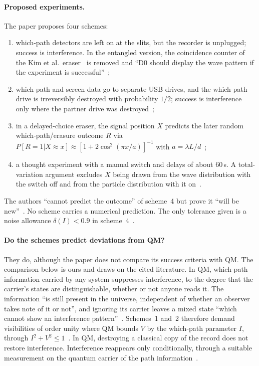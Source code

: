 \paragraph{Proposed experiments.}
The paper proposes four schemes:
\begin{enumerate}
\item which-path detectors are left on at the slits, but the recorder is
  unplugged; success is interference. In the entangled version, the
  coincidence counter of the Kim et al.\ eraser~\cite{Kim2000delayed} is
  removed and ``D0 should display the wave pattern if the experiment is
  successful''~\cite[p.~86]{Campbell2017on};
\item which-path and screen data go to separate USB drives, and the which-path
  drive is irreversibly destroyed with probability $1/2$; success is
  interference only where the partner drive was
  destroyed~\cite[pp.~87--88]{Campbell2017on};
\item in a delayed-choice eraser, the signal position $X$ predicts the later
  random which-path/erasure outcome $R$ via
  $P[R{=}1|X{\approx}x]\approx[1+2\cos^2(\pi x/a)]^{-1}$ with
  $a=\lambda L/d$~\cite[Eq.~(2)]{Campbell2017on};
\item a thought experiment with a manual switch and delays of about 60\,s. A
  total-variation argument excludes $X$ being drawn from the wave distribution
  with the switch off and from the particle distribution with it
  on~\cite[Eqs.~(3)--(4)]{Campbell2017on}.
\end{enumerate}
The authors ``cannot predict the outcome'' of scheme~4 but prove it ``will be
new''~\cite[p.~83]{Campbell2017on}. No scheme carries a numerical prediction.
The only tolerance given is a noise allowance $\delta(I)<0.9$ in
scheme~4~\cite[p.~94]{Campbell2017on}.

\paragraph{Do the schemes predict deviations from QM?}
They do, although the paper does not compare its success criteria with QM. The
comparison below is ours and draws on the cited literature. In QM, which-path
information carried by any system suppresses interference, to the degree that the
carrier's states are distinguishable, whether or not anyone reads it. The information ``is still present in the universe, independent of
whether an observer takes note of it or not'', and ignoring its carrier leaves
a mixed state ``which cannot show an interference
pattern''~\cite[Sec.~II.E]{Ma2016delayed}. Schemes~1 and~2 therefore demand
visibilities of order unity where QM bounds $V$ by the which-path parameter $I$,
through $I^2+V^2\le1$~\cite{Englert1996fringe,Ma2013quantum}. In QM,
destroying a classical copy of the record does not restore interference. Interference
reappears only conditionally, through a suitable measurement on the quantum
carrier of the path information~\cite{Ma2016delayed,Kastner2019delayed}.

